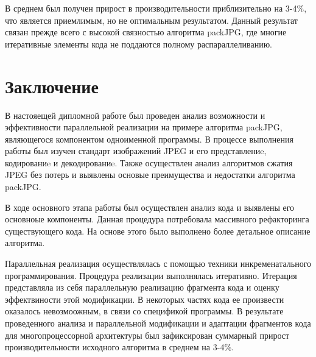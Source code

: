 \documentclass{matmex-diploma-custom}
\begin{document}
В среднем был получен прирост в производительности приблизительно на 3-4\%, что является приемлимым, но не оптимальным результатом. Данный результат связан прежде всего с высокой связностью алгоритма packJPG, где многие итеративные элементы кода не поддаются полному распараллеливанию.

\section*{Заключение}
В настояещей дипломной работе был проведен анализ возможности и эффективности параллельной реализации на примере алгоритма packJPG, являющегося компонентом одноименной программы.
В процессе выполнения работы был изучен стандарт изображений JPEG и его представлениe, кодированиe и декодированиe. Также осуществлен анализ алгоритмов сжатия JPEG без потерь и выявлены основые преимущества и недостатки алгоритма packJPG.


В ходе основного этапа работы был осуществлен анализ кода и выявлены  его основноые компоненты. Данная процедура потребовала массивного рефакторинга существующего кода. На основе этого было выполнено более детальное описание алгоритма.

Параллельная  реализация осуществлялась с помощью техники инкременатального программирования. Процедура реализации выполнялась итеративно. Итерация представляла из себя параллельную реализацию фрагмента кода и оценку эффектвиности этой модификации. В некоторых частях кода ее произвести оказалось невозмоожным, в связи со спецификой программы. В результате проведенного анализа и параллельной модификации и адаптации фрагментов кода для многопроцессорной архитектуры был зафиксирован суммарный прирост производительности исходного алгоритма в среднем на 3-4\%.



\end{document}
